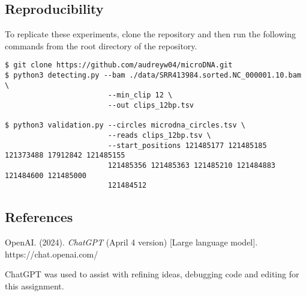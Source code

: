 \documentclass[11pt, letterpaper]{article}
\begin{document}
\subsection{Reproducibility}
To replicate these experiments, clone the repository and then run the
following commands from the root directory of the repository.

\begin{verbatim}
$ git clone https://github.com/audreyw04/microDNA.git
$ python3 detecting.py --bam ./data/SRR413984.sorted.NC_000001.10.bam \ 
                        --min_clip 12 \ 
                        --out clips_12bp.tsv

$ python3 validation.py --circles microdna_circles.tsv \
                        --reads clips_12bp.tsv \
                        --start_positions 121485177 121485185 121373488 17912842 121485155 
                        121485356 121485363 121485210 121484883 121484600 121485000 
                        121484512
\end{verbatim}

\subsection{References}
\begin{thebibliography}{9}

    OpenAI. (2024). \textit{ChatGPT} (April 4 version) [Large language model]. https://chat.openai.com/
    
    \end{thebibliography}

    ChatGPT was used to assist with refining ideas, debugging code and editing for this assignment. 
\end{document}
